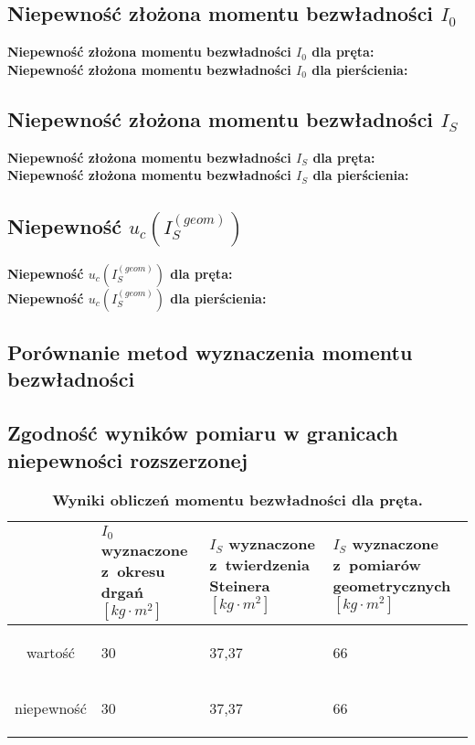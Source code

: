 \documentclass[a4paper,11pt]{article}
\begin{document}
\subsection{Niepewność złożona momentu bezwładności $I_{0}$}
\textbf{Niepewność złożona momentu bezwładności $I_{0}$ dla pręta:}
$$$$
\textbf{Niepewność złożona momentu bezwładności $I_{0}$ dla pierścienia:}

\subsection{Niepewność złożona momentu bezwładności $I_{S}$}
\textbf{Niepewność złożona momentu bezwładności $I_{S}$ dla pręta:}
$$$$
\textbf{Niepewność złożona momentu bezwładności $I_{S}$ dla pierścienia:}

\subsection{Niepewność $u_{c}(I_{S}^{(geom)})$}
\textbf{Niepewność $u_{c}(I_{S}^{(geom)})$ dla pręta:}
$$$$
\textbf{Niepewność $u_{c}(I_{S}^{(geom)})$ dla pierścienia:}

\subsection{Porównanie metod wyznaczenia momentu bezwładności}

\subsection{Zgodność wyników pomiaru w granicach niepewności rozszerzonej}

\begin{table}[ht]
\centering
\caption{\textbf{Wyniki obliczeń momentu bezwładności dla pręta.}}
\begin{tabular}{|c|m{30mm}|m{30mm}|m{30mm}|}
\hline
& $I_{0}$ wyznaczone z~okresu drgań $[kg\cdot m^{2}]$ & $I_{S}$ wyznaczone z~twierdzenia Steinera $[kg\cdot m^{2}]$ & $I_{S}$ wyznaczone z~pomiarów geometrycznych $[kg\cdot m^{2}]$  \\ \hline
wartość & \begin{center}30\end{center} & \begin{center}37,37\end{center} & \begin{center}66\end{center}\\ \hline
niepewność &\begin{center}30\end{center} & \begin{center}37,37\end{center} & \begin{center}66\end{center}\\ \hline

\end{tabular}
\end{table}
\end{document}
